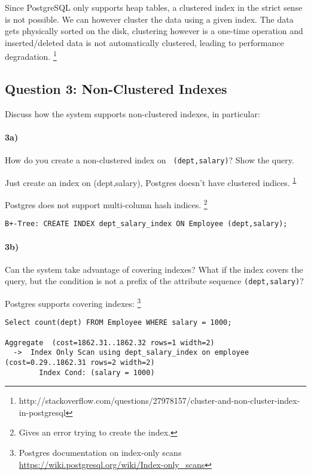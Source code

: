 \documentclass[11pt]{scrartcl}
\begin{document}
\smallskip

\vspace{1em}
Since PostgreSQL only supports heap tables, a clustered index in the strict sense
is not possible. We can however cluster the data using a given index. The data
gets physically sorted on the disk, clustering however is a one-time operation
and inserted/deleted data is not automatically clustered, leading to performance
degradation.
\footnote{\label{so:cluster}http://stackoverflow.com/questions/27978157/cluster-and-non-cluster-index-in-postgresql}

\subsection*{Question 3: Non-Clustered Indexes}

Discuss how the system supports non-clustered indexes, in
particular:

\paragraph{3a)} How do you create a non-clustered index on {\tt
  (dept,salary)}? Show the query.

\vspace{1em}
Just create an index on (dept,salary), Postgres doesn't have clustered indices.
\textsuperscript{\ref{so:cluster}}

Postgres does not support multi-column hash indices.
\footnote{Gives an error trying to create the index.}

{\small
\begin{verbatim}
B+-Tree: CREATE INDEX dept_salary_index ON Employee (dept,salary);
\end{verbatim}
}

\paragraph{3b)} Can the system take advantage of covering indexes? What if the
index covers the query, but the condition is not a prefix of the
attribute sequence {\tt (dept,salary)}?

\vspace{1em}
Postgres supports covering indexes:
\footnote{Postgres documentation on index-only scans
\url{https://wiki.postgresql.org/wiki/Index-only_scans}}

{\small
\begin{verbatim}
Select count(dept) FROM Employee WHERE salary = 1000;

Aggregate  (cost=1862.31..1862.32 rows=1 width=2)
  ->  Index Only Scan using dept_salary_index on employee  (cost=0.29..1862.31 rows=2 width=2)
        Index Cond: (salary = 1000)
\end{verbatim}
}
\end{document}
